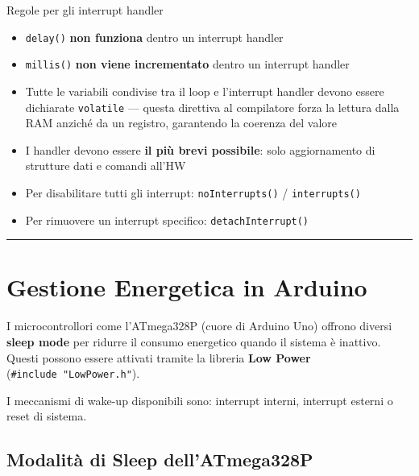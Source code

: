 \documentclass[
  italian,
  openany]{book}
\providecommand{\tightlist}{%
  \setlength{\itemsep}{0pt}\setlength{\parskip}{0pt}}
\begin{document}
\begin{calloutwarning}{Regole per gli interrupt handler}

\begin{itemize}
\tightlist
\item
  \texttt{delay()} \textbf{non funziona} dentro un interrupt handler
\item
  \texttt{millis()} \textbf{non viene incrementato} dentro un interrupt
  handler\\
\item
  Tutte le variabili condivise tra il loop e l'interrupt handler devono
  essere dichiarate \texttt{volatile} --- questa direttiva al
  compilatore forza la lettura dalla RAM anziché da un registro,
  garantendo la coerenza del valore
\item
  I handler devono essere \textbf{il più brevi possibile}: solo
  aggiornamento di strutture dati e comandi all'HW
\item
  Per disabilitare tutti gli interrupt: \texttt{noInterrupts()} /
  \texttt{interrupts()}
\item
  Per rimuovere un interrupt specifico: \texttt{detachInterrupt()}
\end{itemize}

\end{calloutwarning}

\begin{center}\rule{0.5\linewidth}{0.5pt}\end{center}

\section{Gestione Energetica in
Arduino}\label{gestione-energetica-in-arduino}

I microcontrollori come l'ATmega328P (cuore di Arduino Uno) offrono
diversi \textbf{sleep mode} per ridurre il consumo energetico quando il
sistema è inattivo. Questi possono essere attivati tramite la libreria
\textbf{Low Power} (\texttt{\#include\ "LowPower.h"}).

I meccanismi di wake-up disponibili sono: interrupt interni, interrupt
esterni o reset di sistema.

\subsection{Modalità di Sleep
dell'ATmega328P}\label{modalituxe0-di-sleep-dellatmega328p}
\end{document}
